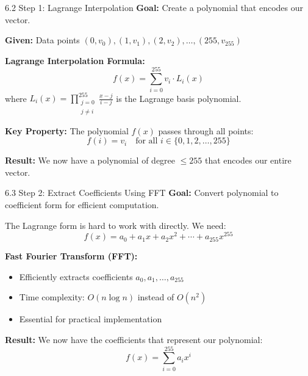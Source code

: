 \documentclass{beamer}
\begin{document}
\begin{frame}{6.2 Step 1: Lagrange Interpolation}
    \textbf{Goal:} Create a polynomial that encodes our vector.
    
    \vspace{0.3cm}
    \textbf{Given:} Data points $(0, v_0), (1, v_1), (2, v_2), \dots, (255, v_{255})$
    
    \textbf{Lagrange Interpolation Formula:}
    \[
    f(x) = \sum_{i=0}^{255} v_i \cdot L_i(x)
    \]
    where $L_i(x) = \prod\limits_{\substack{j=0 \\ j \neq i}}^{255} \frac{x - j}{i - j}$ is the Lagrange basis polynomial.
    
    \pause
    \vspace{0.3cm}
    \textbf{Key Property:} The polynomial $f(x)$ passes through all points:
    \[
    f(i) = v_i \quad \text{for all } i \in \{0, 1, 2, \dots, 255\}
    \]
    
    \pause
    \vspace{0.3cm}
    \textbf{Result:} We now have a polynomial of degree $\leq 255$ that encodes our entire vector.
\end{frame}

\begin{frame}{6.3 Step 2: Extract Coefficients Using FFT}
    \textbf{Goal:} Convert polynomial to coefficient form for efficient computation.
    
    \vspace{0.3cm}
    The Lagrange form is hard to work with directly. We need:
    \[
    f(x) = a_0 + a_1 x + a_2 x^2 + \cdots + a_{255} x^{255}
    \]
    
    \pause
    \vspace{0.3cm}
    \textbf{Fast Fourier Transform (FFT):}
    \begin{itemize}
        \item Efficiently extracts coefficients $a_0, a_1, \dots, a_{255}$
        \item Time complexity: $O(n \log n)$ instead of $O(n^2)$
        \item Essential for practical implementation
    \end{itemize}
    
    \pause
    \vspace{0.3cm}
    \textbf{Result:} We now have the coefficients that represent our polynomial:
    \[
    f(x) = \sum_{i=0}^{255} a_i x^i
    \]
\end{frame}
\end{document}

